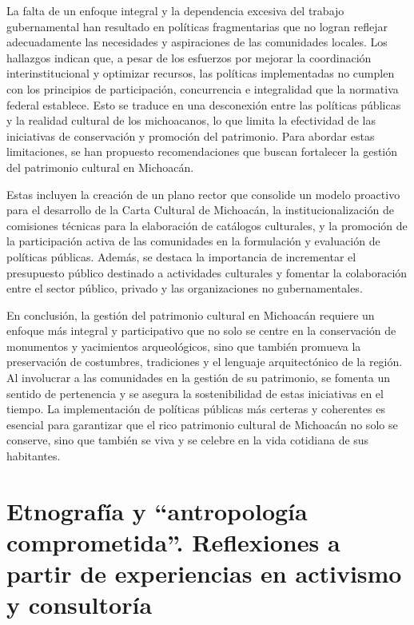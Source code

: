 \documentclass[
  spanish,
  11pt,
  a4paper,
]{scrbook}
\begin{document}
La falta de un enfoque integral y la dependencia excesiva del trabajo
gubernamental han resultado en políticas fragmentarias que no logran
reflejar adecuadamente las necesidades y aspiraciones de las comunidades
locales. Los hallazgos indican que, a pesar de los esfuerzos por mejorar
la coordinación interinstitucional y optimizar recursos, las políticas
implementadas no cumplen con los principios de participación,
concurrencia e integralidad que la normativa federal establece. Esto se
traduce en una desconexión entre las políticas públicas y la realidad
cultural de los michoacanos, lo que limita la efectividad de las
iniciativas de conservación y promoción del patrimonio. Para abordar
estas limitaciones, se han propuesto recomendaciones que buscan
fortalecer la gestión del patrimonio cultural en Michoacán.

Estas incluyen la creación de un plano rector que consolide un modelo
proactivo para el desarrollo de la Carta Cultural de Michoacán, la
institucionalización de comisiones técnicas para la elaboración de
catálogos culturales, y la promoción de la participación activa de las
comunidades en la formulación y evaluación de políticas públicas.
Además, se destaca la importancia de incrementar el presupuesto público
destinado a actividades culturales y fomentar la colaboración entre el
sector público, privado y las organizaciones no gubernamentales.

En conclusión, la gestión del patrimonio cultural en Michoacán requiere
un enfoque más integral y participativo que no solo se centre en la
conservación de monumentos y yacimientos arqueológicos, sino que también
promueva la preservación de costumbres, tradiciones y el lenguaje
arquitectónico de la región. Al involucrar a las comunidades en la
gestión de su patrimonio, se fomenta un sentido de pertenencia y se
asegura la sostenibilidad de estas iniciativas en el tiempo. La
implementación de políticas públicas más certeras y coherentes es
esencial para garantizar que el rico patrimonio cultural de Michoacán no
solo se conserve, sino que también se viva y se celebre en la vida
cotidiana de sus habitantes.

\printbibliography[heading=subbibliography, title={Referencias Bibliográficas}]


\chapter{Etnografía y ``antropología comprometida''. Reflexiones a
partir de experiencias en activismo y
consultoría}\label{etnografuxeda-y-antropologuxeda-comprometida.-reflexiones-a-partir-de-experiencias-en-activismo-y-consultoruxeda}
\end{document}
